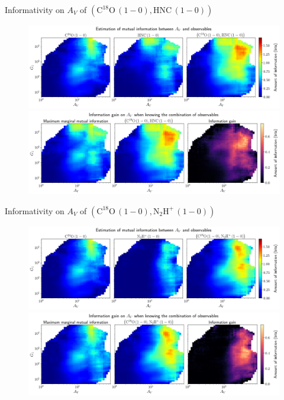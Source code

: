 \documentclass{beamer}
\begin{document}
\begin{frame}{Informativity on $A_V$ of $\left(\mathrm{C^{18}O\,(1-0)},\mathrm{HNC\,(1-0)}\right)$}
    \begin{figure}
        \centering
        \includegraphics[width=0.95\linewidth]{../mi/av__c18o10_hnc10_mi.png}
        \vfill
        \includegraphics[width=0.95\linewidth]{../mi/av__c18o10_hnc10_mi_gain.png}
    \end{figure}
\end{frame}

\begin{frame}{Informativity on $A_V$ of $\left(\mathrm{C^{18}O\,(1-0)},\mathrm{N_2H^+\,(1-0)}\right)$}
    \begin{figure}
        \centering
        \includegraphics[width=0.95\linewidth]{../mi/av__c18o10_n2hp10_mi.png}
        \vfill
        \includegraphics[width=0.95\linewidth]{../mi/av__c18o10_n2hp10_mi_gain.png}
    \end{figure}
\end{frame}
\end{document}
